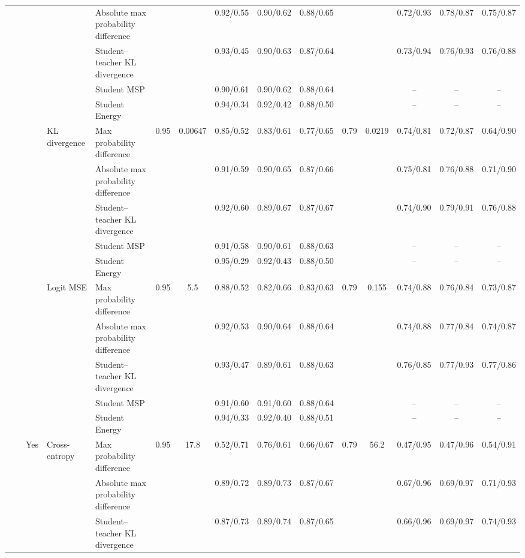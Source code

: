 \documentclass[border=2pt]{standalone}
\begin{document}
\begin{tabular}{lllllcccccccccc}
 &  &  &  & Absolute max probability difference &  &  & 0.92/0.55 & 0.90/0.62 & 0.88/0.65 &  &  & 0.72/0.93 & 0.78/0.87 & 0.75/0.87 \\
 &  &  &  & Student--teacher KL divergence &  &  & 0.93/0.45 & 0.90/0.63 & 0.87/0.64 &  &  & 0.73/0.94 & 0.76/0.93 & 0.76/0.88 \\
 &  &  &  & Student MSP &  &  & 0.90/0.61 & 0.90/0.62 & 0.88/0.64 &  &  & -- & -- & -- \\
 &  &  &  & Student Energy &  &  & 0.94/0.34 & 0.92/0.42 & 0.88/0.50 &  &  & -- & -- & -- \\
 &  &  & KL divergence & Max probability difference & 0.95 & 0.00647 & 0.85/0.52 & 0.83/0.61 & 0.77/0.65 & 0.79 & 0.0219 & 0.74/0.81 & 0.72/0.87 & 0.64/0.90 \\
 &  &  &  & Absolute max probability difference &  &  & 0.91/0.59 & 0.90/0.65 & 0.87/0.66 &  &  & 0.75/0.81 & 0.76/0.88 & 0.71/0.90 \\
 &  &  &  & Student--teacher KL divergence &  &  & 0.92/0.60 & 0.89/0.67 & 0.87/0.67 &  &  & 0.74/0.90 & 0.79/0.91 & 0.76/0.88 \\
 &  &  &  & Student MSP &  &  & 0.91/0.58 & 0.90/0.61 & 0.88/0.63 &  &  & -- & -- & -- \\
 &  &  &  & Student Energy &  &  & 0.95/0.29 & 0.92/0.43 & 0.88/0.50 &  &  & -- & -- & -- \\
 &  &  & Logit MSE & Max probability difference & 0.95 & 5.5 & 0.88/0.52 & 0.82/0.66 & 0.83/0.63 & 0.79 & 0.155 & 0.74/0.88 & 0.76/0.84 & 0.73/0.87 \\
 &  &  &  & Absolute max probability difference &  &  & 0.92/0.53 & 0.90/0.64 & 0.88/0.64 &  &  & 0.74/0.88 & 0.77/0.84 & 0.74/0.87 \\
 &  &  &  & Student--teacher KL divergence &  &  & 0.93/0.47 & 0.89/0.61 & 0.88/0.63 &  &  & 0.76/0.85 & 0.77/0.93 & 0.77/0.86 \\
 &  &  &  & Student MSP &  &  & 0.91/0.60 & 0.91/0.60 & 0.88/0.64 &  &  & -- & -- & -- \\
 &  &  &  & Student Energy &  &  & 0.94/0.33 & 0.92/0.40 & 0.88/0.51 &  &  & -- & -- & -- \\
 &  & Yes & Cross-entropy & Max probability difference & 0.95 & 17.8 & 0.52/0.71 & 0.76/0.61 & 0.66/0.67 & 0.79 & 56.2 & 0.47/0.95 & 0.47/0.96 & 0.54/0.91 \\
 &  &  &  & Absolute max probability difference &  &  & 0.89/0.72 & 0.89/0.73 & 0.87/0.67 &  &  & 0.67/0.96 & 0.69/0.97 & 0.71/0.93 \\
 &  &  &  & Student--teacher KL divergence &  &  & 0.87/0.73 & 0.89/0.74 & 0.87/0.65 &  &  & 0.66/0.96 & 0.69/0.97 & 0.74/0.93 \\

\end{tabular}
\end{document}
